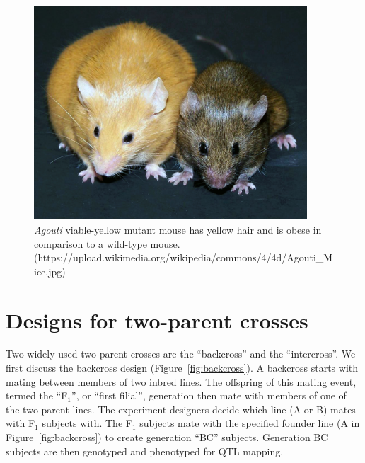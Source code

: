 \documentclass[oneside]{book}\usepackage[]{graphicx}\usepackage[]{color}
\begin{document}
\begin{figure}
\includegraphics[height=8cm]{figs/Agouti.jpg}
\caption{\emph{Agouti} viable-yellow mutant mouse has yellow hair and is obese in comparison to a wild-type mouse. (https://upload.wikimedia.org/wikipedia/commons/4/4d/Agouti\_Mice.jpg)}
\label{fig:agouti}
\end{figure}






\section{Designs for two-parent crosses}\label{sec:two-parent-designs}

Two widely used two-parent crosses are the ``backcross'' and the
``intercross''. We first discuss the backcross design
(Figure~\ref{fig:backcross}). A backcross starts with mating between
members of two inbred lines. The offspring of this mating event,
termed the ``F$_1$'', or ``first filial'', generation then mate
with members of one of the two parent lines. The experiment designers
decide which line (A or B) mates with F$_1$ subjects
with. The F$_1$ subjects mate with the specified founder line 
(A in Figure~\ref{fig:backcross}) to create generation ``BC'' subjects. 
Generation BC subjects are then genotyped and phenotyped for QTL mapping. 
\end{document}
